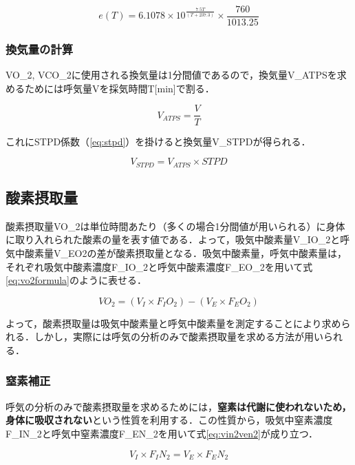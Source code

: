 \begin{equation}
  e(T) = 6.1078 \times 10 ^ \frac{7.5T}{(T + 237.3)} \times \frac{760}{1013.25}
\end{equation}

\subsubsection{換気量の計算}

VO_2, VCO_2に使用される換気量は1分間値であるので，換気量V_{ATPS}を求めるためには呼気量Vを採気時間T[min]で割る．

\begin{equation}
  V_{ATPS} = \frac{V}{T}
\end{equation}

これにSTPD係数（\ref{eq:stpd}）を掛けると換気量V_{STPD}が得られる．

\begin{equation}
  V_{STPD} = V_{ATPS} \times STPD
\end{equation}

\subsection{酸素摂取量}

酸素摂取量VO_2は単位時間あたり（多くの場合1分間値が用いられる）に身体に取り入れられた酸素の量を表す値である．よって，吸気中酸素量V_IO_2と呼気中酸素量V_EO2の差が酸素摂取量となる．吸気中酸素量，呼気中酸素量は，それぞれ吸気中酸素濃度F_IO_2と呼気中酸素濃度F_EO_2を用いて式\ref{eq:vo2formula}のように表せる．

\begin{equation}
  \label{eq:vo2formula}
  VO_2 = (V_I \times F_IO_2) - (V_E \times F_EO_2)
\end{equation}

よって，酸素摂取量は吸気中酸素量と呼気中酸素量を測定することにより求められる．しかし，実際には呼気の分析のみで酸素摂取量を求める方法が用いられる．

\subsubsection{窒素補正}
\label{sec:vo2fromvn2}

呼気の分析のみで酸素摂取量を求めるためには，{\bf 窒素は代謝に使われないため，身体に吸収されない}という性質を利用する．この性質から，吸気中窒素濃度F_IN_2と呼気中窒素濃度F_EN_2を用いて式\ref{eq:vin2ven2}が成り立つ．

\begin{equation}
  \label{eq:vin2ven2}
  V_I \times F_IN_2 = V_E \times F_EN_2
\end{equation}

